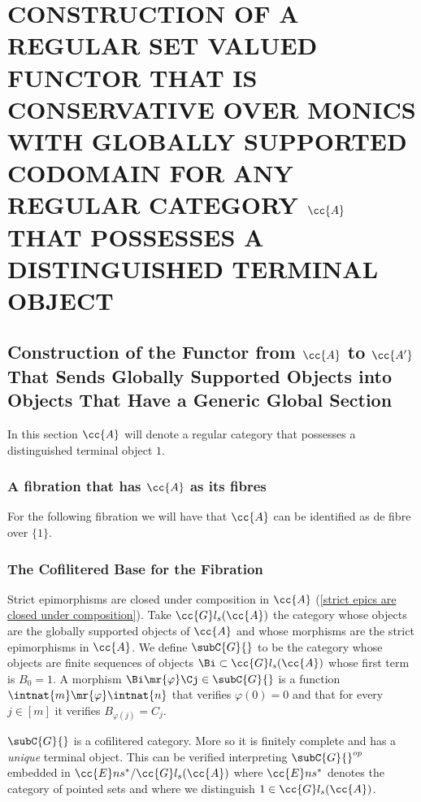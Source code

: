 


\section{CONSTRUCTION OF A REGULAR SET VALUED FUNCTOR THAT IS CONSERVATIVE OVER MONICS WITH GLOBALLY SUPPORTED CODOMAIN FOR ANY REGULAR CATEGORY $\cc{A}$ THAT POSSESSES A DISTINGUISHED TERMINAL OBJECT} \label{construction of a model from A to Ens}

\subsection{Construction of the Functor from $\cc{A}$ to $\cc{A'}$ That Sends Globally Supported Objects into Objects That Have a Generic Global Section} \label{thee fibration}

In this section $\cc{A}$ will denote a regular category that possesses a distinguished terminal object $1$.

\subsubsection{A fibration that has $\cc{A}$ as  its fibres}
For  the following  fibration we will have that $\cc{A}$ can be identified as de fibre over $\{1\}$.

\subsubsection*{The Cofilitered Base for the Fibration}
 Strict epimorphisms are closed under composition in $\cc{A}$ (\ref{strict epics are closed under composition}). Take $\cc{G}l_s(\cc{A})$ the category whose objects are the globally supported objects of $\cc{A}$ and whose morphisms are the strict epimorphisms in $\cc{A}$. We define $\subC{G}{}$ to be  the category whose objects are finite sequences of objects $\Bi \subset \cc{G}l_s(\cc{A})$  whose first term is $B_0=1$. A morphism  ${\Bi \mr{\varphi} \Cj \in \subC{G}{}}$ is a function ${\intnat{m} \mr{\varphi} \intnat{n}}$ that verifies ${\varphi(0)=0}$ and that for every $j \in [m]$ it verifies ${B_{\varphi(j)}=C_j}$. 

\begin{remark}
$\subC{G}{}$ is a cofilitered category. More so it is finitely complete and has a \textit{unique} terminal object. This can be verified interpreting $\subC{G}{}^{op}$ embedded in ${\cc{E}ns^*}/{\cc{G}l_s(\cc{A})}$ where  $\cc{E}ns^*$ denotes the category of pointed sets and where we distinguish $1 \in \cc{G}l_s(\cc{A})$. 
\end{remark}



